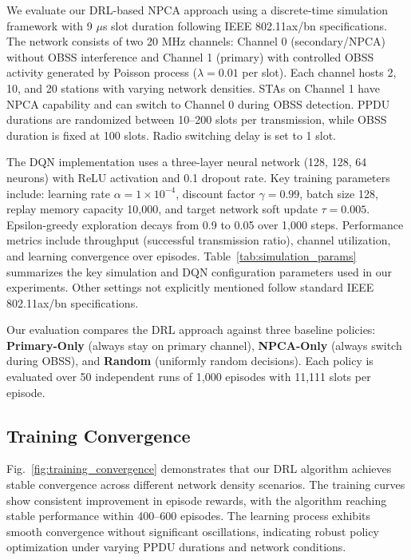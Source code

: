 \documentclass[conference]{IEEEtran}
\begin{document}
We evaluate our DRL-based NPCA approach using a discrete-time simulation framework with 9 $\mu$s slot duration following IEEE 802.11ax/bn specifications. The network consists of two 20 MHz channels: Channel 0 (secondary/NPCA) without OBSS interference and Channel 1 (primary) with controlled OBSS activity generated by Poisson process ($\lambda = 0.01$ per slot). Each channel hosts 2, 10, and 20 stations with varying network densities. STAs on Channel 1 have NPCA capability and can switch to Channel 0 during OBSS detection. PPDU durations are randomized between 10--200 slots per transmission, while OBSS duration is fixed at 100 slots. Radio switching delay is set to 1 slot.

The DQN implementation uses a three-layer neural network (128, 128, 64 neurons) with ReLU activation and 0.1 dropout rate. Key training parameters include: learning rate $\alpha = 1 \times 10^{-4}$, discount factor $\gamma = 0.99$, batch size 128, replay memory capacity 10,000, and target network soft update $\tau = 0.005$. Epsilon-greedy exploration decays from 0.9 to 0.05 over 1,000 steps. Performance metrics include throughput (successful transmission ratio), channel utilization, and learning convergence over episodes. Table~\ref{tab:simulation_params} summarizes the key simulation and DQN configuration parameters used in our experiments. Other settings not explicitly mentioned follow standard IEEE 802.11ax/bn specifications.

Our evaluation compares the DRL approach against three baseline policies: \textbf{Primary-Only} (always stay on primary channel), \textbf{NPCA-Only} (always switch during OBSS), and \textbf{Random} (uniformly random decisions). Each policy is evaluated over 50 independent runs of 1,000 episodes with 11,111 slots per episode.


\subsection{Training Convergence}

Fig.~\ref{fig:training_convergence} demonstrates that our DRL algorithm achieves stable convergence across different network density scenarios. The training curves show consistent improvement in episode rewards, with the algorithm reaching stable performance within 400--600 episodes. The learning process exhibits smooth convergence without significant oscillations, indicating robust policy optimization under varying PPDU durations and network conditions.
\end{document}
